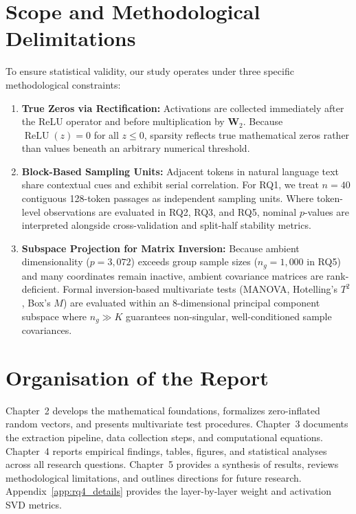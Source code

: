 \documentclass[12pt, a4paper, oneside]{report}
\theoremstyle{definition}
\newcommand{\mat}[1]{\mathbf{#1}}
\begin{document}
\section{Scope and Methodological Delimitations}

To ensure statistical validity, our study operates under three specific methodological constraints:
\begin{enumerate}
    \item \textbf{True Zeros via Rectification:} Activations are collected immediately after the ReLU operator and before multiplication by $\mat{W}_2$. Because $\operatorname{ReLU}(z) = 0$ for all $z \le 0$, sparsity reflects true mathematical zeros rather than values beneath an arbitrary numerical threshold.
    \item \textbf{Block-Based Sampling Units:} Adjacent tokens in natural language text share contextual cues and exhibit serial correlation. For RQ1, we treat $n = 40$ contiguous 128-token passages as independent sampling units. Where token-level observations are evaluated in RQ2, RQ3, and RQ5, nominal $p$-values are interpreted alongside cross-validation and split-half stability metrics.
    \item \textbf{Subspace Projection for Matrix Inversion:} Because ambient dimensionality ($p = 3{,}072$) exceeds group sample sizes ($n_g = 1{,}000$ in RQ5) and many coordinates remain inactive, ambient covariance matrices are rank-deficient. Formal inversion-based multivariate tests (MANOVA, Hotelling's $T^2$, Box's $M$) are evaluated within an $8$-dimensional principal component subspace where $n_g \gg K$ guarantees non-singular, well-conditioned sample covariances.
\end{enumerate}

\section{Organisation of the Report}

Chapter~2 develops the mathematical foundations, formalizes zero-inflated random vectors, and presents multivariate test procedures. Chapter~3 documents the extraction pipeline, data collection steps, and computational equations. Chapter~4 reports empirical findings, tables, figures, and statistical analyses across all research questions. Chapter~5 provides a synthesis of results, reviews methodological limitations, and outlines directions for future research. Appendix~\ref{app:rq4_details} provides the layer-by-layer weight and activation SVD metrics.
\end{document}
